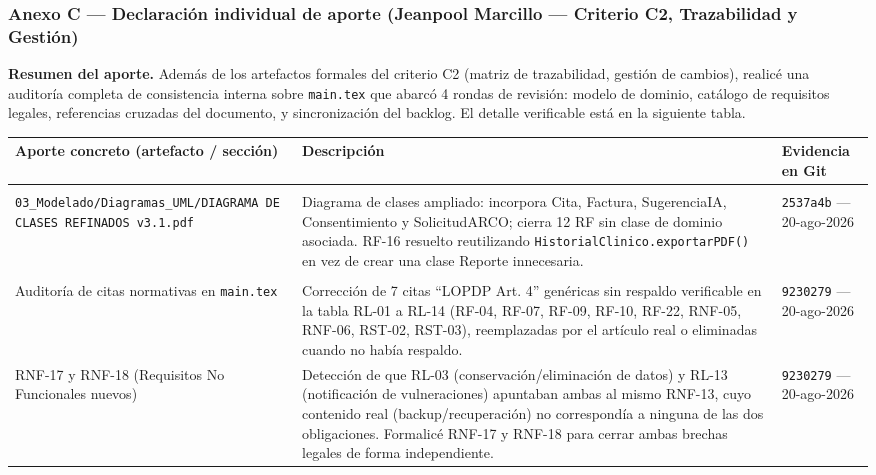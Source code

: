 \subsubsection{Anexo C --- Declaración individual de aporte (Jeanpool
Marcillo --- Criterio C2, Trazabilidad y Gestión)}\label{anexo-c-marcillo}

\textbf{Resumen del aporte.} Además de los artefactos formales del
criterio C2 (matriz de trazabilidad, gestión de cambios), realicé una
auditoría completa de consistencia interna sobre \texttt{main.tex}
que abarcó 4 rondas de revisión: modelo de dominio, catálogo de
requisitos legales, referencias cruzadas del documento, y
sincronización del backlog. El detalle verificable está en la
siguiente tabla.

\begin{longtable}[]{@{}
  >{\raggedright\arraybackslash}p{}
  >{\raggedright\arraybackslash}p{}
  >{\raggedright\arraybackslash}p{}@{}}
\toprule\noalign{}
\textbf{Aporte concreto (artefacto / sección)} &
\textbf{Descripción} &
\textbf{Evidencia en Git} \\
\midrule\noalign{}
\endhead
\bottomrule\noalign{}
\endlastfoot

\multicolumn{3}{@{}l}{\textbf{Ronda 1 --- Modelo de dominio}} \\

\texttt{03\_Modelado/Diagramas\_UML/DIAGRAMA DE CLASES REFINADOS v3.1.pdf} &
Diagrama de clases ampliado: incorpora Cita, Factura, SugerenciaIA,
Consentimiento y SolicitudARCO; cierra 12 RF sin clase de dominio
asociada. RF-16 resuelto reutilizando \texttt{HistorialClinico.ex\-por\-tar\-PDF()}
en vez de crear una clase Reporte innecesaria. &
\texttt{2537a4b} --- 20-ago-2026 \\

\multicolumn{3}{@{}l}{\textbf{Ronda 2 --- Catálogo de requisitos legales (LOPDP)}} \\

Auditoría de citas normativas en \texttt{main.tex} &
Corrección de 7 citas ``LOPDP Art. 4'' genéricas sin respaldo verificable
en la tabla RL-01 a RL-14 (RF-04, RF-07, RF-09, RF-10, RF-22, RNF-05,
RNF-06, RST-02, RST-03), reemplazadas por el artículo real o eliminadas
cuando no había respaldo. &
\texttt{9230279} --- 20-ago-2026 \\

RNF-17 y RNF-18 (Requisitos No Funcionales nuevos) &
Detección de que RL-03 (conservación/eliminación de datos) y RL-13
(notificación de vulneraciones) apuntaban ambas al mismo RNF-13, cuyo
contenido real (backup/recuperación) no correspondía a ninguna de las
dos obligaciones. Formalicé RNF-17 y RNF-18 para cerrar ambas brechas
legales de forma independiente. &
\texttt{9230279} --- 20-ago-2026 \\


\end{longtable}
